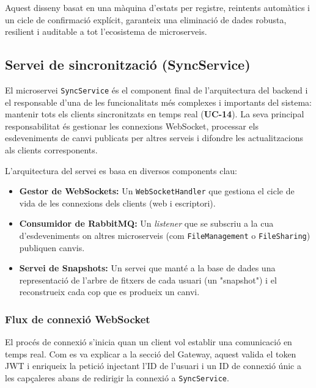Aquest disseny basat en una màquina d'estats per registre, reintents automàtics i un cicle de confirmació explícit, garanteix una eliminació de dades robusta, resilient i auditable a tot l'ecosistema de microserveis.

\subsection{Servei de sincronització (SyncService)}

El microservei \texttt{SyncService} és el component final de l'arquitectura del backend i el responsable d'una de les funcionalitats més complexes i importants del sistema: mantenir tots els clients sincronitzats en temps real (\textbf{UC-14}). La seva principal responsabilitat és gestionar les connexions WebSocket, processar els esdeveniments de canvi publicats per altres serveis i difondre les actualitzacions als clients corresponents.

L'arquitectura del servei es basa en diversos components clau:
\begin{itemize}
    \item \textbf{Gestor de WebSockets:} Un \texttt{WebSocketHandler} que gestiona el cicle de vida de les connexions dels clients (web i escriptori).
    \item \textbf{Consumidor de RabbitMQ:} Un \textit{listener} que se subscriu a la cua d'esdeveniments on altres microserveis (com \texttt{FileManagement} o \texttt{FileSharing}) publiquen canvis.
    \item \textbf{Servei de Snapshots:} Un servei que manté a la base de dades una representació de l'arbre de fitxers de cada usuari (un "snapshot") i el reconstrueix cada cop que es produeix un canvi.
\end{itemize}

\subsubsection{Flux de connexió WebSocket}

El procés de connexió s'inicia quan un client vol establir una comunicació en temps real. Com es va explicar a la secció del Gateway, aquest valida el token JWT i enriqueix la petició injectant l'ID de l'usuari i un ID de connexió únic a les capçaleres abans de redirigir la connexió a \texttt{SyncService}.

